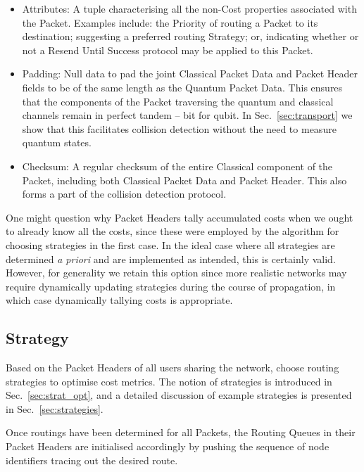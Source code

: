 \documentclass[aps,rmp,twocolumn,amsmath,amssymb,nofootinbib,superscriptaddress]{revtex4}
\begin{document}
\begin{itemize}
    \item {\sc Attributes}: A tuple characterising all the non-{\sc Cost} properties associated with the {\sc Packet}. Examples include: the {\sc Priority} of routing a {\sc Packet} to its destination; suggesting a preferred routing {\sc Strategy}; or, indicating whether or not a {\sc Resend Until Success} protocol may be applied to this {\sc Packet}.
    \item {\sc Padding}: Null data to pad the joint {\sc Classical Packet Data} and {\sc Packet Header} fields to be of the same length as the {\sc Quantum Packet Data}. This ensures that the components of the {\sc Packet} traversing the quantum and classical channels remain in perfect tandem -- bit for qubit. In Sec.~\ref{sec:transport} we show that this facilitates collision detection without the need to measure quantum states.
    \item {\sc Checksum}: A regular checksum of the entire {\sc Classical} component of the {\sc Packet}, including both {\sc Classical Packet Data} and {\sc Packet Header}. This also forms a part of the collision detection protocol.
\end{itemize}

One might question why {\sc Packet Headers} tally accumulated costs when we ought to already know all the costs, since these were employed by the algorithm for choosing strategies in the first case. In the ideal case where all strategies are determined \emph{a priori} and are implemented as intended, this is certainly valid. However, for generality we retain this option since more realistic networks may require dynamically updating strategies during the course of propagation, in which case dynamically tallying costs is appropriate.

%
%

\subsection{Strategy} \label{sec:into_strat}

Based on the {\sc Packet Headers} of all users sharing the network, choose routing strategies to optimise cost metrics. The notion of strategies is introduced in Sec.~\ref{sec:strat_opt}, and a detailed discussion of example strategies is presented in Sec.~\ref{sec:strategies}.

Once routings have been determined for all {\sc Packets}, the {\sc Routing Queues} in their {\sc Packet Headers} are initialised accordingly by pushing the sequence of node identifiers tracing out the desired route.
\end{document}
